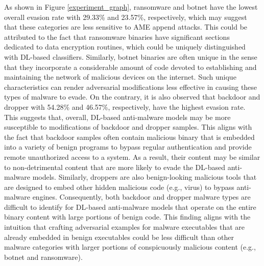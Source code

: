 \documentclass[letterpaper]{article}
\begin{document}
As shown in Figure \ref{experiment_graph}, ransomware and botnet have the lowest overall evasion rate with 29.33\% and 23.57\%, respectively, which may suggest that these categories are less sensitive to AME append attacks. This could be attributed to the fact that ransomware binaries have significant sections dedicated to data encryption routines, which could be uniquely distinguished with DL-based classifiers. Similarly, botnet binaries are often unique in the sense that they incorporate a considerable amount of code devoted to establishing and maintaining the network of malicious devices on the internet. Such unique characteristics can render adversarial modifications less effective in causing these types of malware to evade. On the contrary, it is also observed that backdoor and dropper with 54.28\% and 46.57\%, respectively, have the highest evasion rate. This suggests that, overall, DL-based anti-malware models may be more susceptible to modifications of backdoor and dropper samples. This aligns with the fact that backdoor samples often contain malicious binary that is embedded into a variety of benign programs to bypass regular authentication and provide remote unauthorized access to a system. As a result, their content may be similar to non-detrimental content that are more likely to evade the DL-based anti-malware models. Similarly, droppers are also benign-looking malicious tools that are designed to embed other hidden malicious code (e.g., virus) to bypass anti-malware engines. Consequently, both backdoor and dropper malware types are difficult to identify for DL-based anti-malware models that operate on the entire binary content with large portions of benign code. This finding aligns with the intuition that crafting adversarial examples for malware executables that are already embedded in benign executables could be less difficult than other malware categories with larger portions of conspicuously malicious content (e.g., botnet and ransomware).
\end{document}
